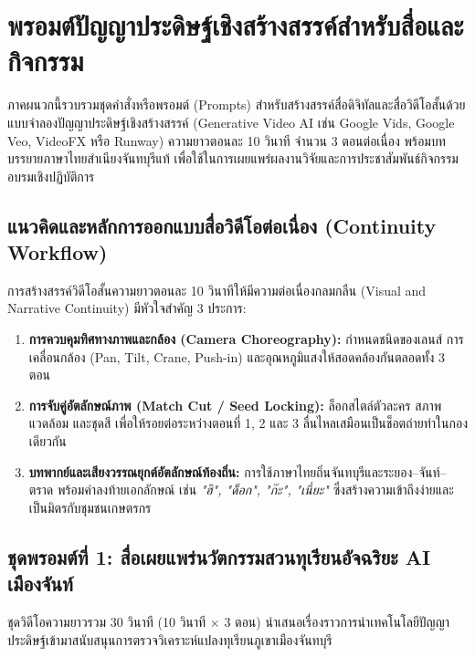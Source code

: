 \chapter{พรอมต์ปัญญาประดิษฐ์เชิงสร้างสรรค์สำหรับสื่อและกิจกรรม}
\label{app:generative_ai_prompts}

ภาคผนวกนี้รวบรวมชุดคำสั่งหรือพรอมต์ (Prompts) สำหรับสร้างสรรค์สื่อดิจิทัลและสื่อวิดีโอสั้นด้วยแบบจำลองปัญญาประดิษฐ์เชิงสร้างสรรค์ (Generative Video AI เช่น Google Vids, Google Veo, VideoFX หรือ Runway) ความยาวตอนละ 10 วินาที จำนวน 3 ตอนต่อเนื่อง พร้อมบทบรรยายภาษาไทยสำเนียงจันทบุรีแท้ เพื่อใช้ในการเผยแพร่ผลงานวิจัยและการประชาสัมพันธ์กิจกรรมอบรมเชิงปฏิบัติการ

\section{แนวคิดและหลักการออกแบบสื่อวิดีโอต่อเนื่อง (Continuity Workflow)}
การสร้างสรรค์วิดีโอสั้นความยาวตอนละ 10 วินาทีให้มีความต่อเนื่องกลมกลืน (Visual and Narrative Continuity) มีหัวใจสำคัญ 3 ประการ:
\begin{enumerate}[leftmargin=1.8em, itemsep=3pt]
    \item \textbf{การควบคุมทิศทางภาพและกล้อง (Camera Choreography):} กำหนดชนิดของเลนส์ การเคลื่อนกล้อง (Pan, Tilt, Crane, Push-in) และอุณหภูมิแสงให้สอดคล้องกันตลอดทั้ง 3 ตอน
    \item \textbf{การจับคู่อัตลักษณ์ภาพ (Match Cut / Seed Locking):} ล็อกสไตล์ตัวละคร สภาพแวดล้อม และชุดสี เพื่อให้รอยต่อระหว่างตอนที่ 1, 2 และ 3 ลื่นไหลเสมือนเป็นช็อตถ่ายทำในกองเดียวกัน
    \item \textbf{บทพากย์และเสียงวรรณยุกต์อัตลักษณ์ท้องถิ่น:} การใช้ภาษาไทยถิ่นจันทบุรีและระยอง--จันท์--ตราด พร้อมคำลงท้ายเอกลักษณ์ เช่น \textit{"ฮิ", "ด็อก", "ก๊ะ", "เนี่ยะ"} ซึ่งสร้างความเข้าถึงง่ายและเป็นมิตรกับชุมชนเกษตรกร
\end{enumerate}

\section{ชุดพรอมต์ที่ 1: สื่อเผยแพร่นวัตกรรมสวนทุเรียนอัจฉริยะ AI เมืองจันท์}
ชุดวิดีโอความยาวรวม 30 วินาที (10 วินาที $\times$ 3 ตอน) นำเสนอเรื่องราวการนำเทคโนโลยีปัญญาประดิษฐ์เข้ามาสนับสนุนการตรวจวิเคราะห์แปลงทุเรียนภูเขาเมืองจันทบุรี


